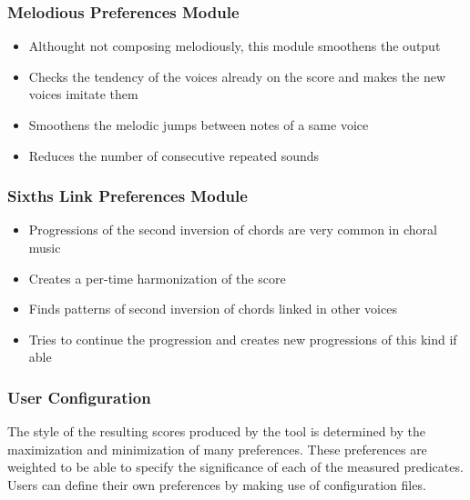 \documentclass[english]{beamer}
\begin{document}
	\begin{frame}
	\frametitle{Melodious Preferences Module}
	\begin{itemize}
		\item Althought not composing melodiously, this module smoothens the output
		\item Checks the tendency of the voices already on the score and makes the new voices imitate them
		\item Smoothens the melodic jumps between notes of a same voice
		\item Reduces the number of consecutive repeated sounds
	\end{itemize}
	\end{frame}
	\begin{frame}
	\frametitle{Sixths Link Preferences Module}
	\begin{itemize}
		\item Progressions of the second inversion of chords are very common in choral music
		\item Creates a per-time harmonization of the score
		\item Finds patterns of second inversion of chords linked in other voices
		\item Tries to continue the progression and creates new progressions of this kind if able
	\end{itemize}
	\end{frame}
	\begin{frame}
	\frametitle{User Configuration}
		The style of the resulting scores produced by the tool is determined by the maximization and minimization of many preferences. These preferences are weighted to be able to specify the significance of each of the measured predicates. Users can define their own preferences by making use of configuration files.
	\end{frame}
\end{document}
